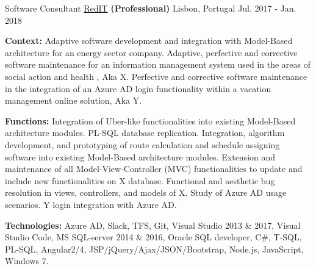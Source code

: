 \begin{cventries}
  \cventry
    {Software Consultant} %
    {\href{https://www.reditpro.com/}{RedIT} \textbf{(Professional)}} %
    {Lisbon, Portugal} %
    {Jul. 2017 - Jan. 2018} 
    {
      \begin{cvitems} %
		\item[] {\textbf{Context:} 
Adaptive software development and integration with Model-Based architecture for an energy sector company. %
Adaptive, perfective and corrective software maintenance for an information management system used in the areas of social action and health%
, Aka X.
Perfective and corrective software maintenance in the integration of an Azure AD login functionality within a vacation management online solution, Aka Y.}
		\item[] {\textbf{Functions:} Integration of Uber-like functionalities into existing Model-Based architecture modules. PL-SQL database replication. Integration, algorithm development, and prototyping of route calculation and schedule assigning software into existing Model-Based architecture modules.
		Extension and maintenance of all Model-View-Controller (MVC) functionalities to update and include new functionalities on X database. Functional and aesthetic bug resolution in views, controllers, and models of X.
		Study of Azure AD usage scenarios. Y login integration with Azure AD.}		
		\item[] {\textbf{Technologies:} \textcolor{rainbowcolor-olive}{Azure AD}, \textcolor{rainbowcolor-olive}{Slack}, \textcolor{rainbowcolor-olive}{TFS}, \textcolor{rainbowcolor-olive}{Git}, \textcolor{rainbowcolor-olive}{Visual Studio 2013 \& 2017}, \textcolor{rainbowcolor-olive}{Visual Studio Code}, \textcolor{rainbowcolor-olive}{MS SQL-server 2014 \& 2016}, \textcolor{rainbowcolor-olive}{Oracle SQL developer}, \textcolor{rainbowcolor-indigo}{C\#}, \textcolor{rainbowcolor-indigo}{T-SQL}, \textcolor{rainbowcolor-indigo}{PL-SQL}, \textcolor{rainbowcolor-indigo}{Angular2/4}, \textcolor{rainbowcolor-indigo}{JSP/jQuery/Ajax/JSON/Bootstrap}, \textcolor{rainbowcolor-indigo}{Node.js}, \textcolor{rainbowcolor-indigo}{JavaScript}, \textcolor{rainbowcolor-orange}{Windows 7}.}	
      \end{cvitems}
    } 
    

\end{cventries}

